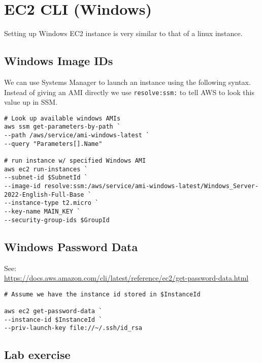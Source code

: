 \chapter{EC2 CLI (Windows)}

Setting up Windows EC2 instance is very similar to that of a linux instance.

\section{Windows Image IDs}

We can use Systems Manager to launch an instance using the following
syntax. Instead of giving an AMI directly we use \texttt{resolve:ssm:}
to tell AWS to look this value up in SSM.

\begin{verbatim}
# Look up available windows AMIs
aws ssm get-parameters-by-path `
--path /aws/service/ami-windows-latest `
--query "Parameters[].Name"

# run instance w/ specified Windows AMI
aws ec2 run-instances `
--subnet-id $SubnetId `
--image-id resolve:ssm:/aws/service/ami-windows-latest/Windows_Server-2022-English-Full-Base `
--instance-type t2.micro `
--key-name MAIN_KEY `
--security-group-ids $GroupId
\end{verbatim}

\section{Windows Password Data}
\label{sec:windows-password-data}

See:\\
\url{https://docs.aws.amazon.com/cli/latest/reference/ec2/get-password-data.html}

\begin{verbatim}
# Assume we have the instance id stored in $InstanceId

aws ec2 get-password-data `
--instance-id $InstanceId `
--priv-launch-key file://~/.ssh/id_rsa
\end{verbatim}

\section{Lab exercise}

